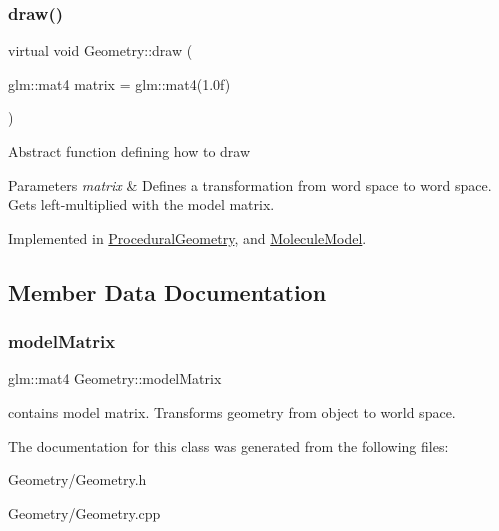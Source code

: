 \subsubsection{\texorpdfstring{draw()}{draw()}}
{\footnotesize\ttfamily virtual void Geometry\+::draw (\begin{DoxyParamCaption}\item[{glm\+::mat4}]{matrix = {\ttfamily glm\+:\+:mat4(1.0f)} }\end{DoxyParamCaption})\hspace{0.3cm}{\ttfamily [pure virtual]}}

Abstract function defining how to draw


\begin{DoxyParams}{Parameters}
{\em matrix} & Defines a transformation from word space to word space. Gets left-\/multiplied with the model matrix. \\
\hline
\end{DoxyParams}


Implemented in \mbox{\hyperlink{class_procedural_geometry_ab3c3e34093cb3af5756d214b18ff6047}{Procedural\+Geometry}}, and \mbox{\hyperlink{class_molecule_model_a3f33fde639e7778b811467a81e917d15}{Molecule\+Model}}.



\subsection{Member Data Documentation}
\mbox{\label{class_geometry_a03134a55079f6ca6ff750f31869f645e}} 
\subsubsection{\texorpdfstring{modelMatrix}{modelMatrix}}
{\footnotesize\ttfamily glm\+::mat4 Geometry\+::model\+Matrix\hspace{0.3cm}{\ttfamily [protected]}}

contains model matrix. Transforms geometry from object to world space. 

The documentation for this class was generated from the following files\+:\begin{DoxyCompactItemize}
\item 
Geometry/Geometry.\+h\item 
Geometry/Geometry.\+cpp\end{DoxyCompactItemize}
